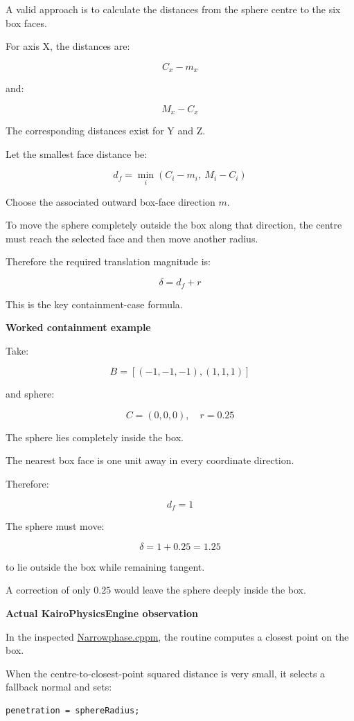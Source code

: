 A valid approach is to calculate the distances from the sphere centre to the six box faces.

For axis X, the distances are:

\[
C_x-m_x
\]

and:

\[
M_x-C_x
\]

The corresponding distances exist for Y and Z.

Let the smallest face distance be:

\[
\boxed{ d_f= \min_i(C_i-m_i,\ M_i-C_i) }
\]

Choose the associated outward box-face direction \(m\).

To move the sphere completely outside the box along that direction, the centre must reach the selected face and then move another radius.

Therefore the required translation magnitude is:

\[
\boxed{ \delta=d_f+r }
\]

This is the key containment-case formula.

\textbf{Worked containment example}

Take:

\[
B=[(-1,-1,-1),(1,1,1)]
\]

and sphere:

\[
C=(0,0,0),\quad r=0.25
\]

The sphere lies completely inside the box.

The nearest box face is one unit away in every coordinate direction.

Therefore:

\[
d_f=1
\]

The sphere must move:

\[
\boxed{\delta=1+0.25=1.25}
\]

to lie outside the box while remaining tangent.

A correction of only \(0.25\) would leave the sphere deeply inside the box.

\textbf{Actual KairoPhysicsEngine observation}

In the inspected \href{https://github.com/swayam8624/KairoPhysicsEngine/blob/main/Narrowphase.cppm?utm_source=chatgpt.com}{Narrowphase.cppm}, the  routine computes a closest point on the box.

When the centre-to-closest-point squared distance is very small, it selects a fallback normal and sets:

\begin{verbatim}
penetration = sphereRadius;
\end{verbatim}

